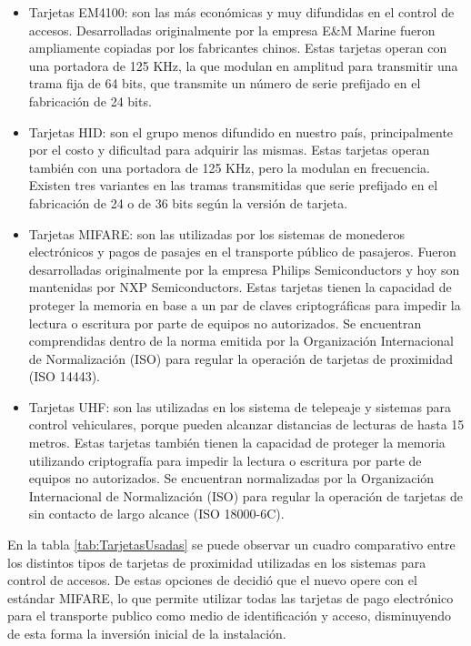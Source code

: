 \begin{itemize}
	\item Tarjetas EM4100: son las más económicas y muy difundidas en el control de accesos. Desarrolladas originalmente por la empresa E\&M Marine fueron ampliamente copiadas por los fabricantes chinos. Estas tarjetas operan con una portadora de 125 KHz, la que modulan en amplitud para transmitir una trama fija de 64 bits, que transmite un número de serie prefijado en el fabricación de 24 bits.
	
	\item Tarjetas HID: son el grupo menos difundido en nuestro país, principalmente por el costo y dificultad para adquirir las mismas. Estas tarjetas operan también con una portadora de 125 KHz, pero la modulan en frecuencia. Existen tres variantes en las tramas transmitidas que  serie prefijado en el fabricación de 24 o de 36 bits según la versión de tarjeta.
	
	\item Tarjetas MIFARE: son las utilizadas por los sistemas de monederos electrónicos y pagos de pasajes en el transporte público de pasajeros. Fueron desarrolladas originalmente por la empresa Philips Semiconductors y hoy son mantenidas por NXP Semiconductors. Estas tarjetas tienen la capacidad de proteger la memoria en base a un par de claves criptográficas para impedir la lectura o escritura por parte de equipos no autorizados. Se encuentran comprendidas dentro de la norma emitida por la Organización Internacional de Normalización (ISO) para regular la operación de tarjetas de proximidad (ISO 14443).
	
	\item Tarjetas UHF: son las utilizadas en los sistema de telepeaje y sistemas para control vehiculares, porque pueden alcanzar distancias de lecturas de hasta 15 metros. Estas tarjetas también tienen la capacidad de proteger la memoria utilizando criptografía para impedir la lectura o escritura por parte de equipos no autorizados. Se encuentran normalizadas por la Organización Internacional de Normalización (ISO) para regular la operación de tarjetas de sin contacto de largo alcance (ISO 18000-6C).
\end{itemize}

En la tabla \ref{tab:TarjetasUsadas} se puede observar un cuadro comparativo entre los distintos tipos de tarjetas de proximidad utilizadas en los sistemas para control de accesos. De estas opciones de decidió que el nuevo opere con el estándar MIFARE, lo que permite utilizar todas las tarjetas de pago electrónico para el transporte publico como medio de identificación y acceso, disminuyendo de esta forma la inversión inicial de la instalación.

